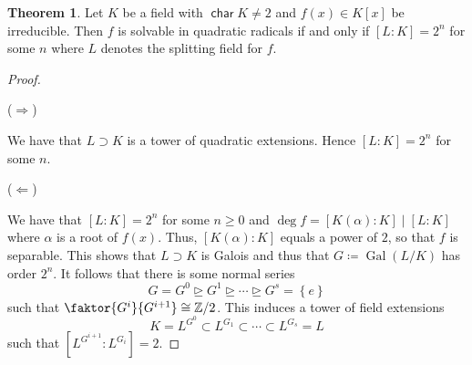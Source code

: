 \documentclass[10pt,letterpaper,cm]{nupset}
\theoremstyle{definition}
\theoremstyle{theorem}
\newtheorem{theorem}[definition]{Theorem}
\theoremstyle{remark}
\newcommand{\Z}{\mathbb Z}
\newcommand{\1}{\mathbf{1}}
\newcommand{\0}{\vec 0}
\DeclareMathOperator{\Char}{\mathsf{char}}
\DeclareMathOperator{\gal}{Gal}
\begin{document}
\begin{theorem}\label{solv}
Let $K$ be a field with $\Char{K} \ne 2$ and $f(x) \in K[x]$ be irreducible. Then $f$ is solvable in quadratic radicals if and only if $[L:K] =2^n$ for some $n$ where $L$ denotes the splitting field for $f$.
\end{theorem}
\begin{proof} $ $

($\Longrightarrow$) 

We have that $L \supset K$ is a tower of quadratic extensions. Hence  $[L:K] = 2^n$ for some $n$. 

\medskip


($\Longleftarrow$)  

We have that $[L:K] = 2^n$ for some $n\geq 0$ and $\deg{f} = [K(\alpha): K] \mid [L: K]$ where $\alpha$ is a root of $f(x)$. Thus, $[K(\alpha): K]$ equals a power of $2$, so that $f$ is separable. This shows that $L \supset K$ is Galois and thus that $G\coloneqq  \gal(L/K)$ has order $2^n$. It follows that there is some normal series $$ G =G^0 \unrhd G^1  \unrhd \cdots \unrhd G^s = \left\{e\right\}  $$ such that $\faktor{G^{i}}{G^{i+1}} \cong \Z/2$. This induces a tower of field  extensions $$ K= L^{G^0} \subset L^{G_1} \subset \cdots \subset L^{G_s} = L   $$ such that $[L^{G^{i+1}}: L^{G_i}] =2$.
\end{proof}

\smallskip
\end{document}
